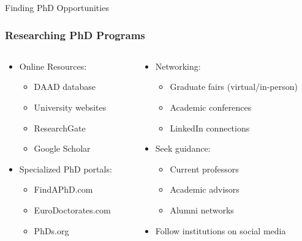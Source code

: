 \documentclass[10pt]{beamer}
\begin{document}
\begin{frame}[fragile]{Finding PhD Opportunities}
    \frametitle{Researching PhD Programs}
    \begin{columns}[T]
        \begin{column}{0.5\textwidth}
            \begin{itemize}
                \item Online Resources:
                    \begin{itemize}
                        \item DAAD database
                        \item University websites
                        \item ResearchGate
                        \item Google Scholar
                    \end{itemize}
                \item Specialized PhD portals:
                    \begin{itemize}
                        \item FindAPhD.com
                        \item EuroDoctorates.com
                        \item PhDs.org
                    \end{itemize}
            \end{itemize}
        \end{column}
        \begin{column}{0.5\textwidth}
            \begin{itemize}
                \item Networking:
                    \begin{itemize}
                        \item Graduate fairs (virtual/in-person)
                        \item Academic conferences
                        \item LinkedIn connections
                    \end{itemize}
                \item Seek guidance:
                    \begin{itemize}
                        \item Current professors
                        \item Academic advisors
                        \item Alumni networks
                    \end{itemize}
                \item Follow institutions on social media
            \end{itemize}
        \end{column}
    \end{columns}
\end{frame}
\end{document}
